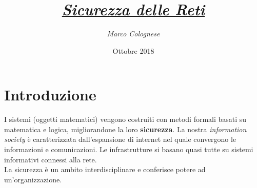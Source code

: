 \documentclass[11pt, a4paper, twoside, italian]{report}
\title{\textbf{\textit{\underline{Sicurezza delle Reti}}}}
\author{\textit{Marco Colognese}}
\date{\small Ottobre 2018}
\theoremstyle{plain}
\begin{document}
\maketitle
\tableofcontents
\newpage



\chapter*{Introduzione}
I sistemi (oggetti matematici) vengono costruiti con metodi formali basati su matematica e logica, migliorandone la loro \textbf{sicurezza}. La nostra \textit{information society} è caratterizzata dall'espansione di internet nel quale convergono le informazioni e comunicazioni. Le infrastrutture si basano quasi tutte su sistemi informativi connessi alla rete.\\
La sicurezza è un ambito interdisciplinare e conferisce potere ad un'organizzazione.
\end{document}
